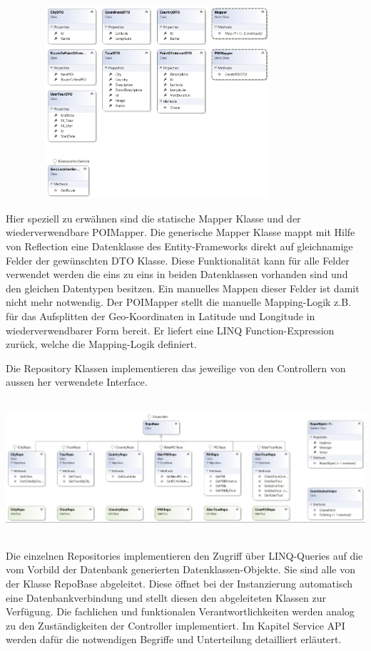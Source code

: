 \documentclass[a4paper,10pt,xetex]{article}
\begin{document}
\includegraphics[width=4.4134in,height=2.8154in]{klassendiagramm_backend2.jpg} 

	Hier speziell zu erw\"ahnen sind die statische Mapper Klasse und der wiederverwendbare POIMapper. Die generische Mapper
	Klasse mappt mit Hilfe von Reflection eine Datenklasse des Entity-Frameworks direkt auf gleichnamige Felder der
	gew\"unschten DTO Klasse. Diese Funktionalit\"at kann f\"ur alle Felder verwendet werden die eins zu eins in beiden
	Datenklassen vorhanden sind und den gleichen Datentypen besitzen. Ein manuelles Mappen dieser Felder ist damit nicht
	mehr notwendig. Der POIMapper stellt die manuelle Mapping-Logik z.B. f\"ur das Aufsplitten der Geo-Koordinaten in
	Latitude und Longitude in wiederverwendbarer Form bereit. Er liefert eine LINQ Function-Expression zur\"uck, welche die
	Mapping-Logik definiert.


	Die Repository Klassen implementieren das jeweilige von den Controllern von aussen her verwendete Interface.

\begin{center}
	\includegraphics[width=6.5in,height=1.9925in]{klassendiagramm_backend3.jpg}
\end{center}


	Die einzelnen Repositories implementieren den Zugriff \"uber LINQ-Queries auf die vom Vorbild der Datenbank generierten
	Datenklassen\--Objekte. Sie sind alle von der Klasse RepoBase abgeleitet. Diese \"offnet bei der Instanzierung
	automatisch eine Datenbankverbindung und stellt diesen den abgeleiteten Klassen zur Verf\"ugung. Die fachlichen und
	funktionalen Verantwortlichkeiten werden analog zu den Zust\"andigkeiten der Controller implementiert. Im Kapitel
	Service API werden daf\"ur die notwendigen Begriffe und Unterteilung detailliert erl\"autert.
\end{document}
